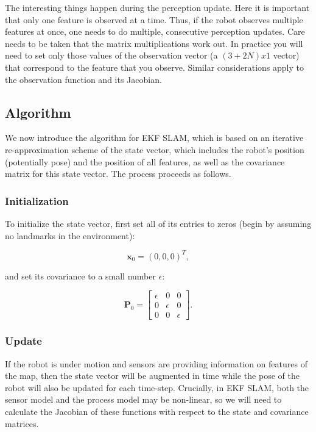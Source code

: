 The interesting things happen during the perception update. Here it is important that only one feature is observed at a time. Thus, if the robot observes multiple features at once, one needs to do multiple, consecutive perception updates. Care needs to be taken that the matrix multiplications work out. In practice you will need to set only those values of the observation vector (a $(3+2N)x1$ vector) that correspond to the feature that you observe. Similar considerations apply to the observation function and its Jacobian.

\subsection{Algorithm} \label{sec:ekfslam_alg}
We now introduce the algorithm for EKF SLAM, which is based on an iterative re-approximation scheme of the state vector, which includes the robot's position (potentially pose) and the position of all features, as well as the covariance matrix for this state vector. The process proceeds as follows.

\subsubsection{Initialization}
To initialize the state vector, first set all of its entries to zeros (begin by assuming no landmarks in the environment):

\begin{equation}
    \boldsymbol{x}_0 = (0,0,0)^T,
\end{equation}

and set its covariance to a small number $\epsilon$:

\begin{equation}
    \boldsymbol{P}_0 = \begin{bmatrix} \epsilon & 0 & 0 \\ 0 & \epsilon & 0 \\ 0 & 0 & \epsilon \end{bmatrix}.
\end{equation}

\subsubsection{Update}
If the robot is under motion and sensors are providing information on features of the map, then the state vector will be augmented in time while the pose of the robot will also be updated for each time-step. Crucially, in EKF SLAM, both the sensor model and the process model may be non-linear, so we will need to calculate the Jacobian of these functions with respect to the state and covariance matrices.

